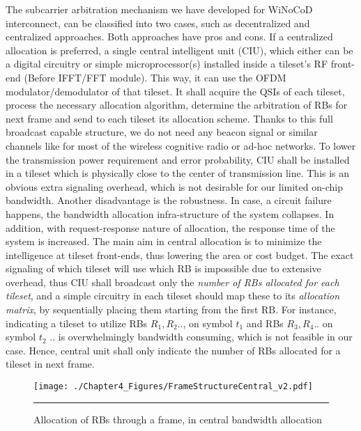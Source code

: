 The subcarrier arbitration mechanism we have developed for WiNoCoD interconnect, can be classified into two cases, such as decentralized and centralized approaches. Both approaches have pros and cons. If a centralized allocation is preferred, a single central intelligent unit (CIU), which either can be a digital circuitry or simple microprocessor(s) installed inside a tileset's RF front-end (Before IFFT/FFT module). This way, it can use the OFDM modulator/demodulator of that tileset. It shall acquire the QSIs of each tileset, process the necessary allocation algorithm, determine the arbitration of RBs for next frame and send to each tileset its allocation scheme. Thanks to this full broadcast capable structure, we do not need any beacon signal or similar channels like for most of the wireless cognitive radio or ad-hoc networks. To lower the transmission power requirement and error probability, CIU shall be installed in a tileset which is physically close to the center of transmission line. This is an obvious extra signaling overhead, which is not desirable for our limited on-chip bandwidth. Another disadvantage is the robustness. In case, a circuit failure happens, the bandwidth allocation infra-structure of the system collapses. In addition, with request-response nature of allocation, the response time of the system is increased. The main aim in central allocation is to minimize the intelligence at tileset front-ends, thus lowering the area or cost budget. The exact signaling of which tileset will use which RB is impossible due to extensive overhead, thus CIU shall broadcast only the \textit{number of RBs allocated for each tileset}, and a simple circuitry in each tileset should map these to its \textit{allocation matrix}, by sequentially placing them starting from the first RB. For instance, indicating a tileset to utilize RBs $R_{1}, R_{2}..$,  on symbol $t_{1}$ and RBs $R_{3}, R_{4}..$ on symbol $t_{2}$ .. is overwhelmingly bandwidth consuming, which is not feasible in our case. Hence, central unit shall only indicate the number of RBs allocated for a tileset in next frame. 



\begin{figure}[htbp]
  \centering
    \texttt{[image: ./Chapter4\_Figures/FrameStructureCentral\_v2.pdf]}
    \rule{35em}{0.5pt}
  \caption[Central Unit Bandwidth Allocation]{Allocation of RBs through a frame, in central bandwidth allocation} 
  \label{fig:Central Unit Bandwidth Allocation}
\end{figure}


